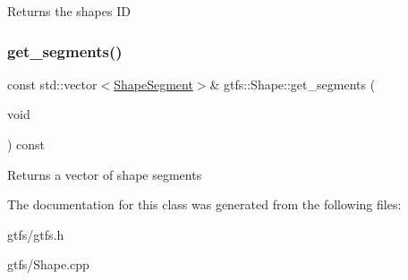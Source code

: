 \begin{DoxyReturn}{Returns}
the shape\textquotesingle{}s ID 
\end{DoxyReturn}
\mbox{\label{classgtfs_1_1Shape_ab6959c8c957c2548313e4cf76bd2a2dd}} 
\subsubsection{\texorpdfstring{get\+\_\+segments()}{get\_segments()}}
{\footnotesize\ttfamily const std\+::vector$<$\hyperlink{structgtfs_1_1ShapeSegment}{Shape\+Segment}$>$\& gtfs\+::\+Shape\+::get\+\_\+segments (\begin{DoxyParamCaption}\item[{void}]{ }\end{DoxyParamCaption}) const\hspace{0.3cm}{\ttfamily [inline]}}

\begin{DoxyReturn}{Returns}
a vector of shape segments 
\end{DoxyReturn}


The documentation for this class was generated from the following files\+:\begin{DoxyCompactItemize}
\item 
gtfs/gtfs.\+h\item 
gtfs/Shape.\+cpp\end{DoxyCompactItemize}
